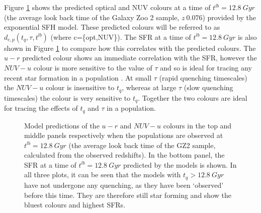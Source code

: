 \documentclass{mn2e}
\begin{document}
Figure \ref{pred} shows the predicted optical and NUV colours at a time of $t^{lb} = 12.8 ~Gyr$ (the average look back time of the Galaxy Zoo 2 sample, $z~0.076$) provided by the exponential SFH model. These predicted colours will be referred to as $d_{c,p}(t_{q}, \tau, t^{lb})$ (where c=\{opt,NUV\}). The SFR at a time of $t^{lb}=12.8~Gyr$ is also shown in Figure \ref{pred} to compare how this correlates with the predicted colours. The $u-r$ predicted colour shows an immediate correlation with the SFR, however the $NUV-u$ colour is more sensitive to the value of $\tau$ and so is ideal for tracing any recent star formation in a population . At small $\tau$ (rapid quenching timescales) the $NUV-u$ colour is insensitive to $t_{q}$, whereas at large $\tau$ (slow quenching timescales) the colour is very sensitive to $t_{q}$. Together the two colours are ideal for tracing the effects of $t_{q}$ and $\tau$ in a population. 


\begin{figure}
\caption{Model predictions of the $u-r$ and $NUV-u$ colours in the top and  middle panels respectively when the populations are observed at $t^{lb} = 12.8~Gyr$ (the average look back time of the GZ2 sample, calculated from the observed redshifts). In the bottom panel, the SFR at a time of $t^{lb} = 12.8 ~Gyr$ predicted by the models is shown. In all three plots, it can be seen that the models with $t_q > 12.8~Gyr$ have not undergone any quenching, as they have been `observed' before this time. They are therefore still star forming and show the bluest colours and highest SFRs.}
\label{pred}
\end{figure}
\end{document}

